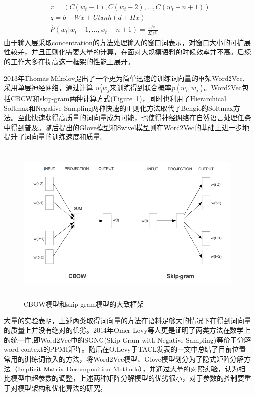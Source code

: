 \documentclass[13pt]{article}
\begin{document}
\begin{align*}
&x=(C(w_t-1),C(w_t-2),...,C(w_t-n+1))\\
&y=b+Wx+Utanh(d+Hx)\\
&\hat{P}(w_t|w_t-1,...,w_t-n+1)=\frac{e^{y_{w_t}}}{\Sigma_{i}e^{y_i}}
\end{align*}
由于输入层采取concentration的方法处理输入的窗口词表示，对窗口大小的可扩展性较差，并且正则化需要大量的计算，在面对大规模语料的时候效率并不高。后续的工作大多在提高这一框架的性能上展开。

2013年Thomas Mikolov提出了一个更为简单迅速的训练词向量的框架Word2Vec\cite{mikolov2013efficient},采用单层神经网络，通过计算
$w_i^{\prime{}}w_j$来训练得到联合概率$p(w_i,w_j)$。Word2Vec包括CBOW和skip-gram两种计算方式(Figure\ \ref{fig:w2v})，同时也利用了Hierarchical Softmax和Negative Sampling两种快速的正则化方法取代了Bengio的Softmax方法。至此快速获得高质量的词向量成为可能，也使得神经网络在自然语言处理任务中得到普及。随后提出的Glove模型\cite{pennington2014glove}和Swivel模型\cite{shazeer2016swivel}则在Word2Vec的基础上进一步地提升了词向量的训练速度和质量。
\begin{figure}[h]
\includegraphics[width=\textwidth,height=8cm]{aaa.jpg}
\caption{CBOW模型和skip-gram模型的大致框架}
\centering
\label{fig:w2v}
\end{figure}

大量的实验表明，上述两类取得词向量的方法在语料足够大的情况下在得到词向量的质量上并没有绝对的优劣。2014年Omer Levy等人更是证明了两类方法在数学上的统一性\cite{levy2014neural},即Word2Vec中的SGNG(Skip-Gram with Negative Sampling)等价于分解word-context的PPMI矩阵。随后在O.Levy于TACL发表的\cite{levy2015improving}一文中总结了目前位置常用的训练词嵌入的方法，将Word2Vec模型、Glove模型划分为了隐式矩阵分解方法（Implicit Matrix Decomposition Methods），并通过大量的对照实验，认为相比模型中超参数的调整，上述两种矩阵分解模型的优劣很小，对于参数的控制要重于对模型架构和优化算法的研究。
\end{document}
